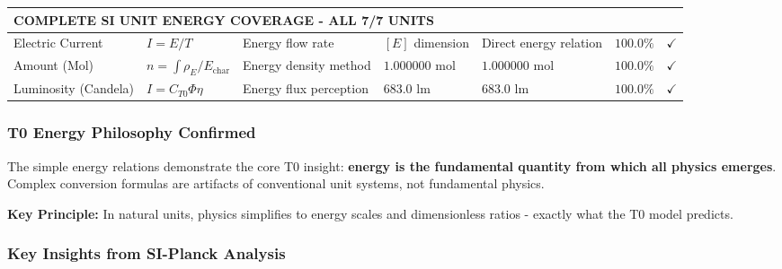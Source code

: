 \documentclass[12pt,a4paper]{article}
\newcommand{\checked}{\checkmark}
\begin{document}
\begin{landscape}
\begin{longtable}{p{3.5cm}p{2.5cm}p{2.5cm}p{4cm}p{3cm}p{2cm}p{1cm}}
\multicolumn{7}{l}{\textbf{COMPLETE SI UNIT ENERGY COVERAGE - ALL 7/7 UNITS}} \\
\midrule

Electric Current & $I = E/T$ & Energy flow rate & $[E]$ dimension & Direct energy relation & $\mathbf{100.0\%}$ & $\checked$ \\

Amount (Mol) & $n = \int \rho_E/E_{\text{char}}$ & Energy density method & $\mathbf{1.000000}$ mol & $1.000000$ mol & $\mathbf{100.0\%}$ & $\checked$ \\

Luminosity (Candela) & $I = C_{T0} \Phi \eta$ & Energy flux perception & $\mathbf{683.0}$ lm & $683.0$ lm & $\mathbf{100.0\%}$ & $\checked$ \\
		
	\end{longtable}
	\normalsize
	

	

	
\end{landscape}
	\subsubsection{T0 Energy Philosophy Confirmed}
\label{subsubsec:t0_philosophy}

The simple energy relations demonstrate the core T0 insight: \textbf{energy is the fundamental quantity from which all physics emerges}. Complex conversion formulas are artifacts of conventional unit systems, not fundamental physics.

\textbf{Key Principle:} In natural units, physics simplifies to energy scales and dimensionless ratios - exactly what the T0 model predicts.	
	\subsubsection{Key Insights from SI-Planck Analysis}
	\label{subsubsec:si_planck_insights}
	
\end{document}

